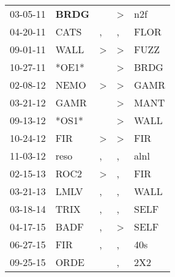 \begin{supertabular}{p{0.07\textwidth}p{0.06\textwidth}p{0.02\textwidth}p{0.02\textwidth}p{0.06\textwidth}}
          03-05-11\textsuperscript{} &  \textbf{BRDG\textsuperscript{}} &                  &  \textgreater &            n2f\textsuperscript{} \\
          04-20-11\textsuperscript{} &           CATS\textsuperscript{} &                , &             , &           FLOR\textsuperscript{} \\
          09-01-11\textsuperscript{} &           WALL\textsuperscript{} &     \textgreater &  \textgreater &           FUZZ\textsuperscript{} \\
          10-27-11\textsuperscript{} &                            *OE1* &                  &  \textgreater &           BRDG\textsuperscript{} \\
          02-08-12\textsuperscript{} &           NEMO\textsuperscript{} &     \textgreater &  \textgreater &           GAMR\textsuperscript{} \\
          03-21-12\textsuperscript{} &           GAMR\textsuperscript{} &                  &  \textgreater &           MANT\textsuperscript{} \\
          09-13-12\textsuperscript{} &                            *OS1* &                  &  \textgreater &           WALL\textsuperscript{} \\
          10-24-12\textsuperscript{} &            FIR\textsuperscript{} &     \textgreater &  \textgreater &            FIR\textsuperscript{} \\
          11-03-12\textsuperscript{} &           reso\textsuperscript{} &                , &             , &           alnl\textsuperscript{} \\
          02-15-13\textsuperscript{} &           ROC2\textsuperscript{} &     \textgreater &             , &            FIR\textsuperscript{} \\
          03-21-13\textsuperscript{} &           LMLV\textsuperscript{} &                , &             , &           WALL\textsuperscript{} \\
          03-18-14\textsuperscript{} &           TRIX\textsuperscript{} &                , &             , &           SELF\textsuperscript{} \\
          04-17-15\textsuperscript{} &           BADF\textsuperscript{} &                , &  \textgreater &           SELF\textsuperscript{} \\
          06-27-15\textsuperscript{} &            FIR\textsuperscript{} &                , &             , &            40s\textsuperscript{} \\
          09-25-15\textsuperscript{} &           ORDE\textsuperscript{} &                  &             , &            2X2\textsuperscript{} \\

\end{supertabular}
